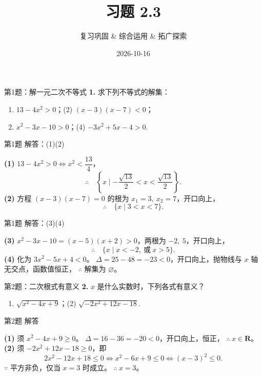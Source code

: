 \documentclass[10pt,aspectratio=169,serif]{beamer}
\title[习题 2.3]{习题 2.3}
\subtitle{复习巩固 \& 综合运用 \& 拓广探索}
\author{}
\institute{}
\date{2026-10-16}
\begin{document}
\begin{frame}
  \titlepage
\end{frame}

\begin{frame}[t]{第1题：解一元二次不等式}
\textbf{1.} 求下列不等式的解集：
\begin{enumerate}
  \item $13-4x^{2}>0$；\qquad (2) $(x-3)(x-7)<0$；
  \item $x^{2}-3x-10>0$；\qquad (4) $-3x^{2}+5x-4>0$.
\end{enumerate}
\end{frame}

\begin{frame}[t]{第1题 解答：(1)(2)}
\begin{tcolorbox}[colback=orange!10,colframe=orange,title=\textbf{解}]
\textbf{(1)} $13-4x^{2}>0 \Longleftrightarrow x^{2}<\dfrac{13}{4}$，
\[
\therefore\quad \left\{x\mid -\frac{\sqrt{13}}{2}<x<\frac{\sqrt{13}}{2}\right\}.
\]
\vspace{0.5em}
\textbf{(2)} 方程 $(x-3)(x-7)=0$ 的根为 $x_{1}=3,\ x_{2}=7$，开口向上，
\[
\therefore\quad \{x\mid 3<x<7\}.
\]
\end{tcolorbox}
\end{frame}

\begin{frame}[t]{第1题 解答：(3)(4)}
\begin{tcolorbox}[colback=orange!10,colframe=orange,title=\textbf{解}]
\textbf{(3)} $x^{2}-3x-10=(x-5)(x+2)>0$，两根为 $-2,\ 5$，开口向上，
\[
\therefore\quad \{x\mid x<-2,\ \text{或}\ x>5\}.
\]
\vspace{0.5em}
\textbf{(4)} 化为 $3x^{2}-5x+4<0$。
$\Delta=25-48=-23<0$，开口向上，抛物线与 $x$ 轴无交点，函数值恒正，
$\therefore$ 解集为 $\varnothing$。
\end{tcolorbox}
\end{frame}

\begin{frame}[t]{第2题：二次根式有意义}
\textbf{2.} $x$ 是什么实数时，下列各式有意义？
\begin{enumerate}
  \item $\sqrt{x^{2}-4x+9}$；\qquad (2) $\sqrt{-2x^{2}+12x-18}$.
\end{enumerate}
\end{frame}

\begin{frame}[t]{第2题 解答}
\begin{tcolorbox}[colback=orange!10,colframe=orange,title=\textbf{解}]
\textbf{(1)} 须 $x^{2}-4x+9\ge 0$。
$\Delta=16-36=-20<0$，开口向上，恒正，
$\therefore\ x\in\mathbf{R}$。
\vspace{0.5em}
\textbf{(2)} 须 $-2x^{2}+12x-18\ge 0$，即
\[
2x^{2}-12x+18\le 0
\Longleftrightarrow x^{2}-6x+9\le 0
\Longleftrightarrow (x-3)^{2}\le 0.
\]
$\because$ 平方非负，仅当 $x=3$ 时成立。
$\therefore\ x=3$。
\end{tcolorbox}
\end{frame}
\end{document}
